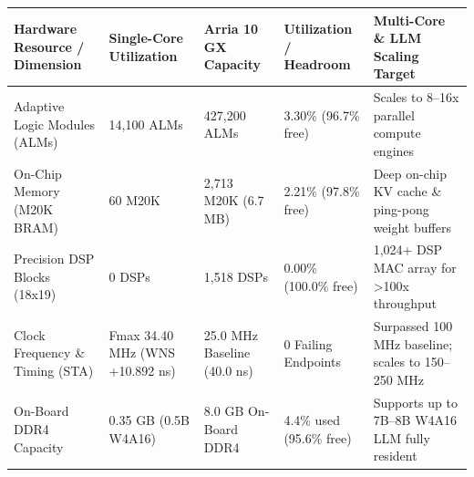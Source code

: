 \documentclass[11pt,a4paper]{article}
\begin{document}
{\footnotesize\renewcommand{\arraystretch}{1.14}\begin{longtable}{@{}L{0.21\textwidth}L{0.16\textwidth}L{0.16\textwidth}L{0.15\textwidth}L{0.22\textwidth}@{}}\toprule

\textbf{Hardware Resource /\allowbreak{} Dimension} & \textbf{Single-Core Utilization} & \textbf{Arria 10 GX Capacity} & \textbf{Utilization /\allowbreak{} Headroom} & \textbf{Multi-Core \& LLM Scaling Target}\\\midrule\endhead

Adaptive Logic Modules (\allowbreak{}ALMs)\allowbreak{} & 14,\allowbreak{}100 ALMs & 427,\allowbreak{}200 ALMs & 3.30\% (\allowbreak{}96.7\% free)\allowbreak{} & Scales to 8--16x parallel compute engines\\[2pt]

On-Chip Memory (\allowbreak{}M20K BRAM)\allowbreak{} & 60 M20K & 2,\allowbreak{}713 M20K (\allowbreak{}6.7 MB)\allowbreak{} & 2.21\% (\allowbreak{}97.8\% free)\allowbreak{} & Deep on-chip KV cache \& ping-pong weight buffers\\[2pt]

Precision DSP Blocks (\allowbreak{}18x19)\allowbreak{} & 0 DSPs & 1,\allowbreak{}518 DSPs & 0.00\% (\allowbreak{}100.0\% free)\allowbreak{} & 1,\allowbreak{}024+\allowbreak{} DSP MAC array for >100x throughput\\[2pt]

Clock Frequency \& Timing (\allowbreak{}STA)\allowbreak{} & Fmax 34.40 MHz (\allowbreak{}WNS +\allowbreak{}10.892 ns)\allowbreak{} & 25.0 MHz Baseline (\allowbreak{}40.0 ns)\allowbreak{} & 0 Failing Endpoints & Surpassed 100 MHz baseline; scales to 150--250 MHz\\[2pt]

On-Board DDR4 Capacity & 0.35 GB (\allowbreak{}0.5B W4A16)\allowbreak{} & 8.0 GB On-Board DDR4 & 4.4\% used (\allowbreak{}95.6\% free)\allowbreak{} & Supports up to 7B--8B W4A16 LLM fully resident\\[2pt]

\bottomrule\end{longtable}}
\end{document}
